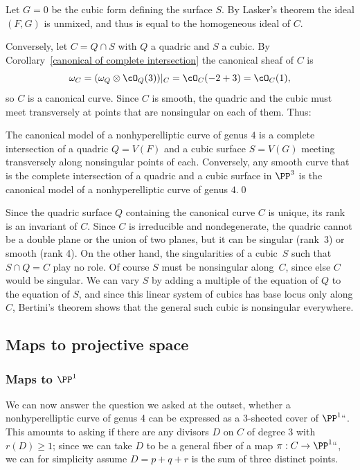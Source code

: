 Let $G=0$ be the cubic form defining the surface $S$. By
Lasker's theorem
%
the ideal $(F,G)$ is unmixed,
and thus is equal to the homogeneous ideal of $C$.

Conversely,
let $C = Q\cap S$ with $Q$ a quadric and $S$ a cubic. By Corollary~\ref{canonical of complete intersection} the canonical sheaf of $C$ is
$$
\omega_C = (\omega_{Q} \otimes \cO_{Q}(3))|_C = \cO_C(-2+3) = \cO_C(1)
,
$$
so $C$ is a canonical curve. Since $C$ is smooth, the quadric and the cubic must meet transversely at points that are nonsingular on each of them. Thus:

\begin{theorem}
\label{canonical genus 4}
The canonical model of a nonhyperelliptic curve of genus $4$ is a
%
%
%
complete intersection of a quadric $Q = V(F)$ and a cubic surface
$S=V(G)$ meeting transversely along nonsingular points of each.
Conversely, any smooth curve that is the complete intersection of a
quadric and a cubic surface in $\PP^3$ is the canonical model of a
nonhyperelliptic curve of genus $4$.\qed
\end{theorem}

Since the quadric surface $Q$ containing the canonical curve $C$
is unique, its rank is an invariant of $C$.
Since $C$ is irreducible and nondegenerate, the quadric cannot be a
double plane or the union of two planes, but it can be singular
(rank~3) or smooth (rank 4). On the other hand, the singularities of a
cubic~$S$ such that $S\cap Q = C$ play no role. Of course $S$ must be
nonsingular along~$C$, since else
$C$ would be singular. We can vary $S$ by adding a multiple of the
equation of $Q$ to the equation of $S$, and since this linear system
of cubics has base locus only along $C$,
Bertini's theorem
%
shows that the general such cubic is nonsingular everywhere.

\subsection*{Maps to projective space}

\subsubsection*{Maps to $\PP^1$}

We can now answer the question we asked at the outset, whether a
nonhyperelliptic curve of genus 4 can be expressed as a 3-sheeted
%
cover of $\PP^1` `$. This amounts to asking if there are any divisors
$D$ on $C$ of degree 3 with $r(D) \geq 1$; since we can take $D$ to be
a general fiber of a map $\pi : C \to \PP^1` `$, we can for simplicity
assume $D = p+q+r$ is the sum of three distinct points.

